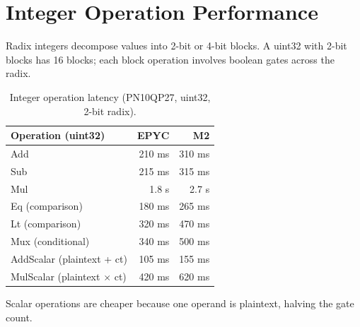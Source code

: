 \section{Integer Operation Performance}


Radix integers decompose values into 2-bit or 4-bit blocks. A uint32 with 2-bit blocks has 16 blocks; each block operation involves boolean gates across the radix.

\begin{table}[h]
\centering
\begin{tabular}{@{}lrr@{}}
\toprule
\textbf{Operation (uint32)} & \textbf{EPYC} & \textbf{M2} \\
\midrule
Add & 210 ms & 310 ms \\
Sub & 215 ms & 315 ms \\
Mul & 1.8 s & 2.7 s \\
Eq (comparison) & 180 ms & 265 ms \\
Lt (comparison) & 320 ms & 470 ms \\
Mux (conditional) & 340 ms & 500 ms \\
\midrule
AddScalar (plaintext + ct) & 105 ms & 155 ms \\
MulScalar (plaintext $\times$ ct) & 420 ms & 620 ms \\
\bottomrule
\end{tabular}
\caption{Integer operation latency (PN10QP27, uint32, 2-bit radix).}
\label{tab:int-ops}
\end{table}

Scalar operations are cheaper because one operand is plaintext, halving the gate count.

